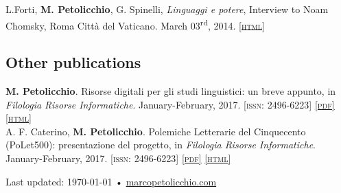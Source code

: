 \documentclass[10pt, a4paper]{article}
\newcommand{\amper}{{\fontspec[Scale=.95]{Adobe Caslon Pro}\selectfont\itshape\&}}
\newcommand{\html}[1]{\href{#1}{\scriptsize\textsc{[html]}}}
\newcommand{\pdf}[1]{\href{#1}{\scriptsize\textsc{[pdf]}}}
\newcommand{\issn}[1]{{\scriptsize\textsc{[issn: #1]}}}
\begin{document}
L.Forti, \textbf{M. Petolicchio}, G. Spinelli, \emph{Linguaggi e potere}, Interview to Noam Chomsky, Roma Città del Vaticano. March 03\textsuperscript{rd}, 2014. \html{http://www.letterefilosofia.com/linguaggi-e-potere-intervista-a-noam-chomsky/} 



\subsection{Other publications}

\textbf{M. Petolicchio}. Risorse digitali per gli studi linguistici: un breve appunto, in \textit{Filologia Risorse Informatiche}. January-February, 2017. \issn{2496-6223} \pdf{http://www.academia.edu/31229297/Risorse_digitali_per_gli_studi_linguistici_un_breve_appunto_in_Filologia_Risorse_Informatiche_gennaio-febbraio_2017} \html{https://fri.hypotheses.org/658} \\

A. F. Caterino, \textbf{M. Petolicchio}. Polemiche Letterarie del Cinquecento (PoLet500): presentazione del progetto, in \textit{Filologia Risorse Informatiche}. January-February, 2017. \issn{2496-6223} \pdf{http://www.academia.edu/30975804/Polemiche_Letterarie_del_Cinquecento_PoLet500_presentazione_del_progetto_in_Filologia_Risorse_Informatiche_gennaio-febbraio_2017} \html{https://fri.hypotheses.org/651} 






\vfill
\begin{center}
{\scriptsize  Last updated: \today\- • \href{http://marcopetolicchio.com}{marcopetolicchio.com}}
\end{center}
\end{document}
